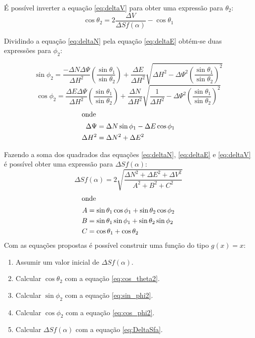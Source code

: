 \documentclass[final,3p,12pt]{elsarticle}
\begin{document}
É possível inverter a equação \ref{eq:deltaV} para obter uma expressão para $\theta_2$:
\begin{equation} \label{eq:cos_theta2}
    \cos \theta_2 = 2 \frac{\Delta V}{\Delta S f(\alpha)} - \cos \theta_1 
\end{equation}

Dividindo a equação \ref{eq:deltaN} pela equação \ref{eq:deltaE} obtém-se duas expressões para $\phi_2$:

\begin{equation} \label{eq:sin_phi2}
    \sin \phi_2 = \frac{-\Delta N \Delta \Psi}{\Delta H^2} \left( \frac{\sin \theta_1}{\sin \theta_2} \right) + \frac{\Delta E}{\Delta H^2} \sqrt{\Delta H^2 - \Delta \Psi^2 \left( \frac{\sin \theta_1}{\sin \theta_2} \right)^2} 
\end{equation}
\begin{equation} \label{eq:cos_phi2}
    \cos \phi_2 = \frac{\Delta E \Delta \Psi}{\Delta H^2} \left( \frac{\sin \theta_1}{\sin \theta_2} \right) + \frac{\Delta N}{\Delta H^2} \sqrt{\frac{1}{\Delta H^2} - \Delta \Psi^2 \left( \frac{\sin \theta_1}{\sin \theta_2} \right)^2} 
\end{equation}
\begin{align*}
    \intertext{onde}
    \Delta \Psi &= \Delta N \sin \phi_1 - \Delta E \cos \phi_1 \\
    \Delta H^2 &= \Delta N^2 + \Delta E^2
\end{align*}

Fazendo a soma dos quadrados das equações \ref{eq:deltaN}, \ref{eq:deltaE} e \ref{eq:deltaV} é possível obter uma expressão para $\Delta S f(\alpha)$:
\begin{equation} \label{eq:DeltaSfa}
    \Delta S f(\alpha) = 2 \sqrt{\frac{\Delta N^2 + \Delta E^2 + \Delta V^2}{A^2+B^2+C^2}}
\end{equation}
\begin{align*}
    \intertext{onde}
    A &= \sin \theta_1 \cos \phi_1 + \sin \theta_2 \cos \phi_2 \\
    B &= \sin \theta_1 \sin \phi_1 + \sin \theta_2 \sin \phi_2 \\
    C &= \cos \theta_1 + \cos \theta_2
\end{align*}
Com as equações propostas é possível construir uma função do tipo $g(x)=x$:

\begin{enumerate}
    \item Assumir um valor inicial de $\Delta S f(\alpha)$.
    \item Calcular $\cos \theta_2$ com a equação \ref{eq:cos_theta2}.
    \item Calcular $\sin \phi_2$ com a equação \ref{eq:sin_phi2}.
    \item Calcular $\cos \phi_2$ com a equação \ref{eq:cos_phi2}.
    \item Calcular $\Delta S f(\alpha)$ com a equação \ref{eq:DeltaSfa}.
\end{enumerate}
\end{document}
